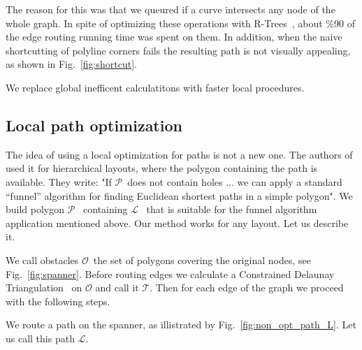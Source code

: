\documentclass{gd-llncs}
\newcommand{\unpath}{$\mathcal{L}$}
\newcommand{\plg}{$\mathcal{P}$}
\begin{document}
The reason for this was that we queured if a curve intersects any node of the whole graph. In spite of optimizing these operations with R-Trees~\cite{guttman1984r}, about \%90 of the edge routing running time was spent on them. In addition, when the naive shortcutting of polyline corners fails the resulting path is not visually appealing, as shown in Fig.~\ref{fig:shortcut}.

We replace global inefficent calculatitons with faster local procedures.
\subsection*{Local path optimization} {
The idea of using a local optimization for paths is not a new one. The authors of~\cite{dobkin1997implementing} used it for hierarchical layouts, where the polygon containing the path is available. They write: "If \plg~does not contain holes ... we can apply a standard “funnel” algorithm \cite{chazelle1982theorem,hershberger1994computing} for finding Euclidean shortest paths in a simple polygon".
We build polygon \plg~ containing \unpath~ that is suitable for the funnel algorithm application mentioned above. Our method works for any layout. Let us describe it.

We call obstacles $\mathcal{O}$~the set of polygons covering the original nodes, see Fig.~\ref{fig:spanner}. Before routing edges we calculate a Constrained Delaunay Triangulation~\cite{delaunay1934sphere} on $\mathcal{O}$ and call it $\mathcal{T}$. Then for each edge of the graph we proceed with the following steps.

We route a path on the spanner, as illistrated by Fig.~\ref{fig:non_opt_path_L}. Let us call this path \unpath.


}
\end{document}
